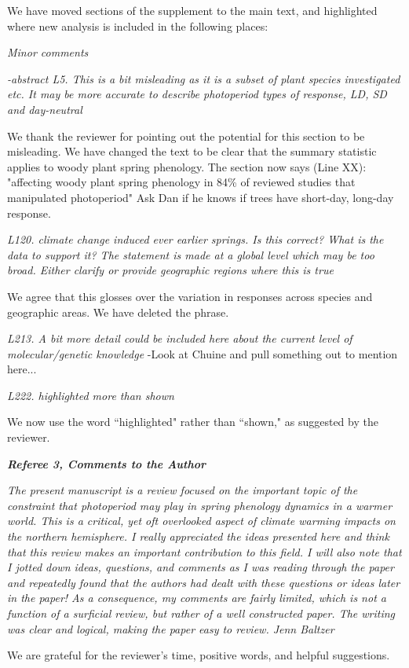 \documentclass{article}
\begin{document}
\par We have moved sections of the supplement to the main text, and highlighted where new analysis is included in the following places:

\par \emph{Minor comments}
\par \emph{-abstract L5. This is a bit misleading as it is a subset of plant species investigated etc. It may be more accurate to describe photoperiod types of response, LD, SD and day-neutral}

\par We thank the reviewer for pointing out the potential for this section to be misleading. We have changed the text to be clear that the summary statistic applies to woody plant spring phenology. The section now says (Line XX): 
"affecting woody plant spring phenology in 84\% of reviewed studies that manipulated photoperiod"
Ask Dan if he knows if trees have short-day, long-day response. 

\par \emph{L120. climate change induced ever earlier springs. Is this correct? What is the data to support it? The statement is made at a global level which may be too broad. Either clarify or provide geographic regions where this is true}
\par We agree that this glosses over the variation in responses across species and geographic areas. We have deleted the phrase. 

\par \emph{L213. A bit more detail could be included here about the current level of molecular/genetic knowledge}
-Look at Chuine and pull something out to mention here...
\par \emph{L222. highlighted more than shown}
\par We now use the word ``highlighted" rather than ``shown," as suggested by the reviewer.

\emph{{\bf Referee 3, Comments to the Author}}
\par \emph{The present manuscript is a review focused on the important topic of the constraint that photoperiod may play in spring phenology dynamics in a warmer world. This is a critical, yet oft overlooked aspect of climate warming impacts on the northern hemisphere. I really appreciated the ideas presented here and think that this review makes an important contribution to this field. I will also note that I jotted down ideas, questions, and comments as I was reading through the paper and repeatedly found that the authors had dealt with these questions or ideas later in the paper! As a consequence, my comments are fairly limited, which is not a function of a surficial review, but rather of a well constructed paper. The writing was clear and logical, making the paper easy to review. Jenn Baltzer}
\par We are grateful for the reviewer's time, positive words, and helpful suggestions.
\end{document}
